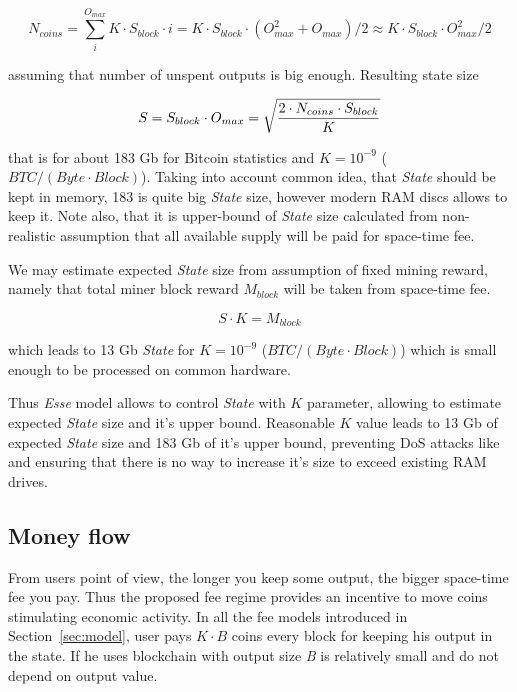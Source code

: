 \documentclass[]{article}   %
\newcommand{\esse}{\textit{Esse}}
\newcommand{\state}{\textit{State}}
\begin{document}
\begin{equation}
N_{coins} = \sum_i^{O_{max}}{K \cdot S_{block} \cdot i} = K \cdot S_{block} \cdot ( O_{max}^2 + O_{max}) / 2 \approx K \cdot S_{block} \cdot O_{max}^2 / 2
\end{equation}

assuming that number of unspent outputs is big enough. Resulting state size

\begin{equation}
\label{eq:statesizemax}
S = S_{block} \cdot O_{max} = \sqrt { 2 \cdot N_{coins} \cdot S_{block} \over K}
\end{equation}

that is for about 183 Gb for Bitcoin statistics and $K=10^{-9}$ ($BTC / (Byte \cdot Block)$). Taking into account common idea, that \state{} should be kept in memory, 183 is quite big \state{} size, however modern RAM discs allows to keep it. Note also, that it is upper-bound of \state{} size calculated from non-realistic assumption that all available supply will be paid for space-time fee.

We may estimate expected \state{} size from assumption of fixed mining reward, namely that total miner block reward $M_{block}$ will be taken from space-time fee.

\begin{equation}
\label{eq:statesizeexp}
S \cdot K = M_{block}
\end{equation}

which leads to 13 Gb \state{} for $K=10^{-9}$ ($BTC / (Byte \cdot Block)$) which is small enough to be processed on common hardware.

Thus \esse{} model allows to control \state{} with $K$ parameter, allowing to estimate expected \state{} size and it's upper bound. Reasonable $K$ value leads to 13 Gb of expected \state{} size and 183 Gb of it's upper bound, preventing DoS attacks like \cite{bitcoin2015flood} and ensuring that there is no way to increase it's size to exceed existing RAM drives.

\subsection{Money flow}
\label{sec:flow}

From users point of view, the longer you keep some output, the bigger space-time fee you pay. Thus the proposed fee regime provides an incentive to move coins stimulating economic activity. In all the fee models introduced in Section~\ref{sec:model}, user pays ${K \cdot B}$ coins every block for keeping his output in the state. If he uses blockchain with output size \textit{B} is relatively small and do not depend on output value.
\end{document}
